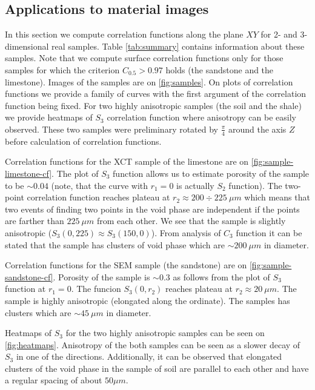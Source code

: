 \documentclass[reprint,amsmath,amssymb,aps,pre,showkeys,showpacs]{revtex4-1}
\begin{document}
\subsection{Applications to material images}
In this section we compute correlation functions along the plane $XY$ for 2- and
3-dimensional real samples. Table \ref{tab:summary} contains information about
these samples. Note that we compute surface correlation functions only for those
samples for which the criterion $C_{0.5} > 0.97$ holds (the sandstone and the
limestone). Images of the samples are on \cref{fig:samples}. On plots of
correlation functions we provide a family of curves with the first argument of
the correlation function being fixed. For two highly anisotropic samples (the
soil and the shale) we provide heatmaps of $S_3$ correlation function where
anisotropy can be easily observed. These two samples were preliminary rotated by
$\frac{\pi}{4}$ around the axis $Z$ before calculation of correlation functions.

Correlation functions for the XCT sample of the limestone are on
\cref{fig:sample-limestone-cf}. The plot of $S_3$ function allows us to estimate
porosity of the sample to be $\sim 0.04$ (note, that the curve with $r_1 = 0$ is
actually $S_2$ function). The two-point correlation function reaches plateau at
$r_2 \approx 200\div 225\ \mu m$ which means that two events of finding two
points in the void phase are independent if the points are farther than
$225\ \mu m$ from each other. We see that the sample is slightly anisotropic
($S_3(0, 225) \approx S_3(150, 0)$). From analysis of $C_3$ function it can be
stated that the sample has clusters of void phase which are $\sim 200\ \mu m$ in
diameter.

Correlation functions for the SEM sample (the sandstone) are on
\cref{fig:sample-sandstone-cf}. Porosity of the sample is $\sim 0.3$ as follows
from the plot of $S_3$ function at $r_1 = 0$. The funcion $S_3(0, r_2)$ reaches
plateau at $r_2 \approx 20\ \mu m$. The sample is highly anisotropic (elongated
along the ordinate). The samples has clusters which are $\sim 45\ \mu m$ in
diameter.

Heatmaps of $S_3$ for the two highly anisotropic samples can be seen on
\cref{fig:heatmaps}. Anisotropy of the both samples can be seen as a slower
decay of $S_3$ in one of the directions. Additionally, it can be observed that
elongated clusters of the void phase in the sample of soil are parallel to each
other and have a regular spacing of about $50 \mu m$.
\end{document}
